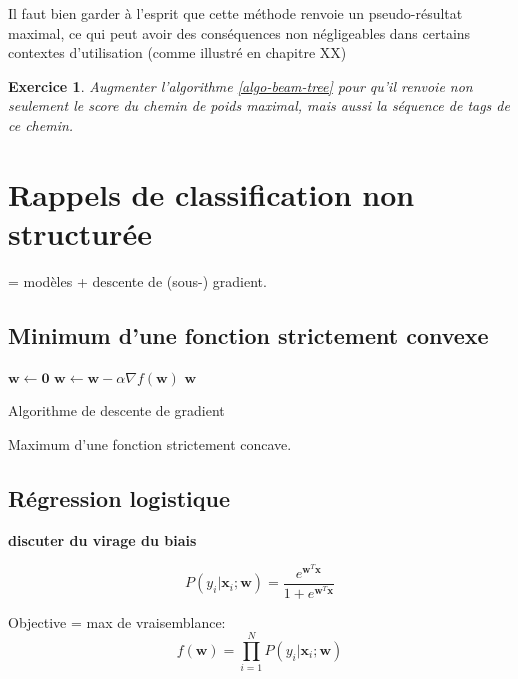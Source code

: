 \documentclass[11pt,openany]{book}
\newtheorem{exo}{Exercice}[chapter]
\begin{document}
Il faut bien garder à l'esprit que cette méthode renvoie un
pseudo-résultat maximal, ce qui peut avoir des conséquences non
négligeables dans certains contextes d'utilisation
(comme illustré en chapitre XX)

\begin{exo}
Augmenter l'algorithme \ref{algo-beam-tree} pour qu'il renvoie
non seulement le score du chemin de poids maximal, mais aussi
la séquence de tags de ce chemin.
\end{exo}

\chapter{Rappels de classification non structurée}

= modèles + descente de (sous-) gradient.

\section{Minimum d'une fonction strictement convexe}



\begin{algorithm}
\begin{algorithmic}
\State $\mathbf{w} \gets \mathbf{0}$
\State $\mathbf{w} \gets \mathbf{w} - \alpha \nabla f(\mathbf{w})$
\EndWhile
\State\Return $\mathbf{w}$
\EndFunction
\end{algorithmic}
\caption{Algorithme de descente de gradient}
\end{algorithm}

Maximum d'une fonction strictement concave.

\section{Régression logistique}
{\bf discuter du virage du biais}

\begin{equation}
 P(y_i|\mathbf{x}_i; \mathbf{w}) =\frac{e^{\mathbf{w}^T \mathbf{x}}}{1+e^{\mathbf{w}^T \mathbf{x}}}
\end{equation}

Objective = max de vraisemblance:
\begin{equation}
f(\mathbf{w}) = \prod_{i=1}^N P(y_i|\mathbf{x}_i; \mathbf{w}) 
\end{equation}
\end{document}
